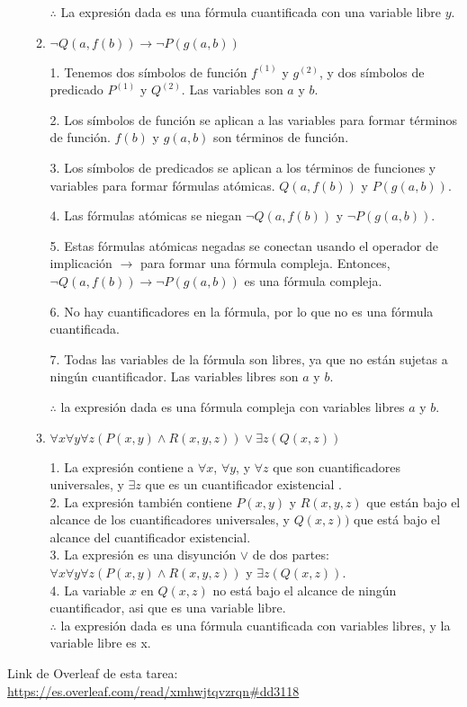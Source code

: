 \documentclass[a4paper,10pt]{article}
\begin{document}
\begin{enumerate}
\begin{enumerate}
$\therefore$ La expresión dada es una fórmula cuantificada con una variable libre \(y\).
\newline
   
  	\item $\neg Q(a, f(b)) \to \neg P(g(a, b))$

1. Tenemos dos símbolos de función \(f^{(1)}\) y \(g^{(2)}\), y dos símbolos de predicado \(P^{(1)}\) y \(Q^{ (2)}\). Las variables son \(a\) y \(b\).

2. Los símbolos de función se aplican a las variables para formar términos de función. \(f(b)\) y \(g(a, b)\) son términos de función.

3. Los símbolos de predicados se aplican a los términos de funciones y variables para formar fórmulas atómicas. \(Q(a, f(b))\) y \(P(g(a, b))\).

4. Las fórmulas atómicas se niegan \(\neg Q(a, f(b))\) y \(\neg P(g(a, b))\).

5. Estas fórmulas atómicas negadas se conectan usando el operador de implicación \(\to\) para formar una fórmula compleja. Entonces, \(\neg Q(a, f(b)) \to \neg P(g(a, b))\) es una fórmula compleja.

6. No hay cuantificadores en la fórmula, por lo que no es una fórmula cuantificada.

7. Todas las variables de la fórmula son libres, ya que no están sujetas a ningún cuantificador. Las variables libres son \(a\) y \(b\).

$\therefore$ la expresión dada es una fórmula compleja con variables libres \(a\) y \(b\).
\newpage 

 	 \item $\forall x \forall y \forall z(P(x,y) \wedge R(x,y,z)) \lor \exists z(Q(x,z))$

1. La expresión contiene a \(\forall x\), \(\forall y\), y \(\forall z\) que son cuantificadores universales, y \(\exists z\) que es un cuantificador existencial .\\

2. La expresión también contiene \(P(x,y)\) y \(R(x,y,z)\) que están bajo el alcance de los cuantificadores universales, y \(Q(x,z) )\) que está bajo el alcance del cuantificador existencial.\\

3. La expresión es una disyunción $\lor$ de dos partes: $\forall x \forall y \forall z(P(x,y) \wedge R(x,y,z))$ y \(\exists z(Q(x,z))\).\\

4. La variable \(x\) en \(Q(x,z)\) no está bajo el alcance de ningún cuantificador, asi que es una variable libre.\\

$\therefore$ la expresión dada es una fórmula cuantificada con variables libres, y la variable libre es x.\\
   
\end{enumerate}
		
\end{enumerate}
Link de Overleaf de esta tarea: \url{https://es.overleaf.com/read/xmhwjtqvzrqn#dd3118}


\end{document}
